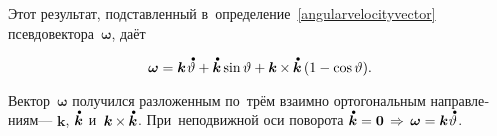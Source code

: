 \begin{otherlanguage}{russian}
Этот результат, подставленный в~определение~\eqref{angularvelocityvector} псевдо\-вектора~$\bm{\omega}$, даёт

\nopagebreak\vspace{-0.5em}\begin{equation}
\bm{\omega} = \bm{k} \hspace{.2ex} \mathdotabove{\vartheta}
+ \mathdotabove{\bm{k}} \operatorname{sin} \vartheta
+ \bm{k} \hspace{-0.1ex}\times\hspace{-0.1ex} \mathdotabove{\bm{k}} \left( 1 - \operatorname{cos} \vartheta \right) \hspace{-0.4ex}.
\end{equation}

\vspace{-0.32em} \noindent Вектор~$\bm{\omega}$ получился разложенным по~трём взаимно ортогональным направлениям\:--- $\bm{k}$, $\mathdotabove{\bm{k}}$ и~${\bm{k} \hspace{-0.1ex}\times\hspace{-0.1ex} \mathdotabove{\bm{k}}}$. При~неподвижной оси поворота ${\mathdotabove{\bm{k}} = \bm{0} \,\Rightarrow\, \bm{\omega} = \bm{k} \hspace{.1ex} \mathdotabove{\vartheta}}$.


\end{otherlanguage}
